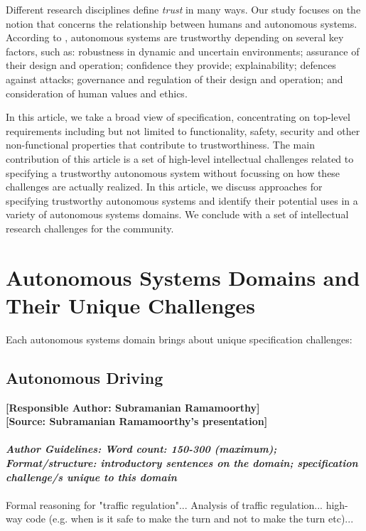 \documentclass[sigconf]{acmart}
\begin{document}
Different research disciplines define \textit{trust} in many ways. 
Our study focuses on the notion that concerns the relationship between humans and autonomous systems. 
According to \cite{TAS-Hub}, autonomous systems are trustworthy depending on several key factors, such as:  robustness in dynamic and uncertain environments; assurance of their design and operation; confidence they provide; explainability; defences against attacks; governance and regulation of their design and operation; and consideration of human values and ethics.

In this article, we take a broad view of specification, concentrating on top-level requirements including but not limited to functionality, safety, security and other non-functional properties that contribute to trustworthiness. 
The main contribution of this article is a set of high-level intellectual challenges related to specifying a trustworthy autonomous system without focussing on how these challenges are actually realized. 
In this article, we discuss approaches for specifying trustworthy autonomous systems and identify their potential uses in a variety of autonomous systems domains. 
We conclude with a set of intellectual research challenges for the community.

\section{Autonomous Systems Domains and Their Unique Challenges}
Each autonomous systems domain brings about unique specification challenges: 

\subsection{Autonomous Driving}
\textbf{[Responsible Author:  Subramanian Ramamoorthy]}\\
\textbf{[Source: Subramanian Ramamoorthy's presentation]}\\\\
\noindent\textbf{\textit{Author Guidelines: Word count: 150-300 (maximum); \\Format/structure: introductory sentences on the domain; specification challenge/s unique to this domain}}\\\\
Formal reasoning for "traffic regulation"...
Analysis of traffic regulation...
high-way code (e.g. when is it safe to make the turn and not to make the turn etc)...
\end{document}
